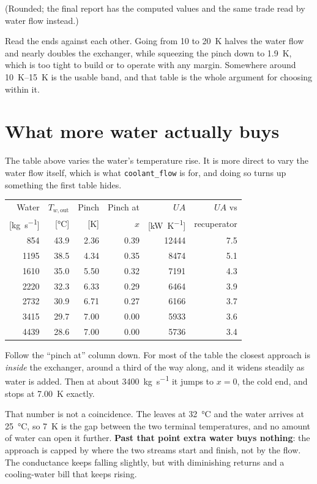 \documentclass[11pt,a4paper]{report}
\newcommand{\code}[1]{\texttt{\small #1}}
\begin{document}
\noindent (Rounded; the final report has the computed values and
the same trade read by water flow instead.)

Read the ends against each other. Going from \SI{10}{} to
\SI{20}{\kelvin} halves the water flow and nearly doubles the exchanger,
while squeezing the pinch down to \SI{1.9}{\kelvin}, which is too tight to
build or to operate with any margin. Somewhere around
\SIrange{10}{15}{\kelvin} is the usable band, and that table is the whole
argument for choosing within it.

\section{What more water actually buys}
\label{sec:watersweep}

The table above varies the water's temperature rise. It is more direct to
vary the water flow itself, which is what \code{coolant\_flow} is for, and
doing so turns up something the first table hides.

\begin{center}
\begin{tabular}{@{}rrrrrr@{}}
\toprule
Water & $T_{w,\text{out}}$ & Pinch & Pinch at & $UA$ & $UA$ vs \\
{[\si{\kilogram\per\second}]} & [\si{\celsius}] & [\si{\kelvin}] & $x$
  & [\si{\kilo\watt\per\kelvin}] & recuperator \\
\midrule
 854 & 43.9 & 2.36 & 0.39 & 12444 & 7.5 \\
1195 & 38.5 & 4.34 & 0.35 &  8474 & 5.1 \\
1610 & 35.0 & 5.50 & 0.32 &  7191 & 4.3 \\
2220 & 32.3 & 6.33 & 0.29 &  6464 & 3.9 \\
2732 & 30.9 & 6.71 & 0.27 &  6166 & 3.7 \\
3415 & 29.7 & 7.00 & 0.00 &  5933 & 3.6 \\
4439 & 28.6 & 7.00 & 0.00 &  5736 & 3.4 \\
\bottomrule
\end{tabular}
\end{center}

Follow the ``pinch at'' column down. For most of the table the closest
approach is \emph{inside} the exchanger, around a third of the way along,
and it widens steadily as water is added. Then at about
\SI{3400}{\kilogram\per\second} it jumps to $x = 0$, the cold end, and stops
at \SI{7.00}{\kelvin} exactly.

That number is not a coincidence. The  leaves at
\SI{32}{\celsius} and the water arrives at \SI{25}{\celsius}, so
\SI{7}{\kelvin} is the gap between the two terminal temperatures, and no
amount of water can open it further. \textbf{Past that point extra water
buys nothing}: the approach is capped by where the two streams start and
finish, not by the flow. The conductance keeps falling slightly, but with
diminishing returns and a cooling-water bill that keeps rising.
\end{document}

